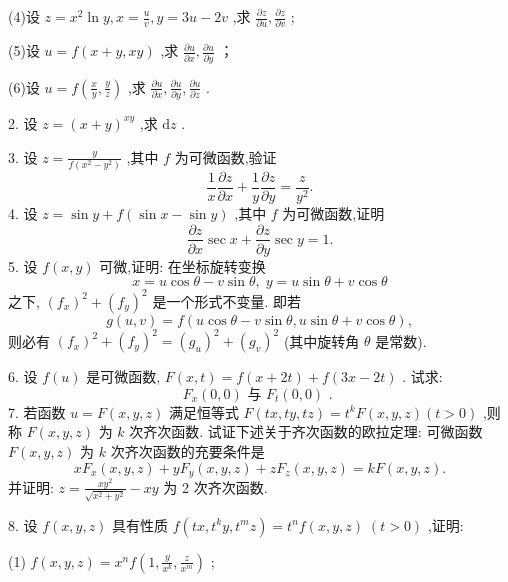 (4)设 \(z = {x}^{2}\ln y,x = \frac{u}{v},y = {3u} - {2v}\) ,求 \(\frac{\partial z}{\partial u},\frac{\partial z}{\partial v}\) ;

(5)设 \(u = f\left( {x + y,{xy}}\right)\) ,求 \(\frac{\partial u}{\partial x},\frac{\partial u}{\partial y}\) ；

(6)设 \(u = f\left( {\frac{x}{y},\frac{y}{z}}\right)\) ,求 \(\frac{\partial u}{\partial x},\frac{\partial u}{\partial y},\frac{\partial u}{\partial z}\) .

2. 设 \(z = {\left( x + y\right) }^{xy}\) ,求 \(\mathrm{d}z\) .

3. 设 \(z = \frac{y}{f\left( {{x}^{2} - {y}^{2}}\right) }\) ,其中 \(f\) 为可微函数,验证
\[
\frac{1}{x}\frac{\partial z}{\partial x} + \frac{1}{y}\frac{\partial z}{\partial y} = \frac{z}{{y}^{2}}.
\]
4. 设 \(z = \sin y + f\left( {\sin x - \sin y}\right)\) ,其中 \(f\) 为可微函数,证明
\[
\frac{\partial z}{\partial x}\sec x + \frac{\partial z}{\partial y}\sec y = 1.
\]
5. 设 \(f\left( {x,y}\right)\) 可微,证明: 在坐标旋转变换
\[
x = u\cos \theta  - v\sin \theta ,\;y = u\sin \theta  + v\cos \theta
\]
之下, \({\left( {f}_{x}\right) }^{2} + {\left( {f}_{y}\right) }^{2}\) 是一个形式不变量. 即若
\[
g\left( {u,v}\right)  = f\left( {u\cos \theta  - v\sin \theta ,u\sin \theta  + v\cos \theta }\right) ,
\]
则必有 \({\left( {f}_{x}\right) }^{2} + {\left( {f}_{y}\right) }^{2} = {\left( {g}_{u}\right) }^{2} + {\left( {g}_{v}\right) }^{2}\) (其中旋转角 \(\theta\) 是常数).

6. 设 \(f\left( u\right)\) 是可微函数, \(F\left( {x,t}\right)  = f\left( {x + {2t}}\right)  + f\left( {{3x} - {2t}}\right)\) . 试求:
\[
{F}_{x}\left( {0,0}\right) \text{ 与 }{F}_{t}\left( {0,0}\right) \text{ . }
\]
7. 若函数 \(u = F\left( {x,y,z}\right)\) 满足恒等式 \(F\left( {{tx},{ty},{tz}}\right)  = {t}^{k}F\left( {x,y,z}\right) \left( {t > 0}\right)\) ,则称 \(F\left( {x,y,z}\right)\) 为 \(k\) 次齐次函数. 试证下述关于齐次函数的欧拉定理: 可微函数 \(F\left( {x,y,z}\right)\) 为 \(k\) 次齐次函数的充要条件是
\[
x{F}_{x}\left( {x,y,z}\right)  + y{F}_{y}\left( {x,y,z}\right)  + z{F}_{z}\left( {x,y,z}\right)  = {kF}\left( {x,y,z}\right) .
\]
并证明: \(z = \frac{x{y}^{2}}{\sqrt{{x}^{2} + {y}^{2}}} - {xy}\) 为 2 次齐次函数.

8. 设 \(f\left( {x,y,z}\right)\) 具有性质 \(f\left( {{tx},{t}^{k}y,{t}^{m}z}\right)  = {t}^{n}f\left( {x,y,z}\right) \;\left( {t > 0}\right)\) ,证明:

(1) \(f\left( {x,y,z}\right)  = {x}^{n}f\left( {1,\frac{y}{{x}^{k}},\frac{z}{{x}^{m}}}\right)\) ;



